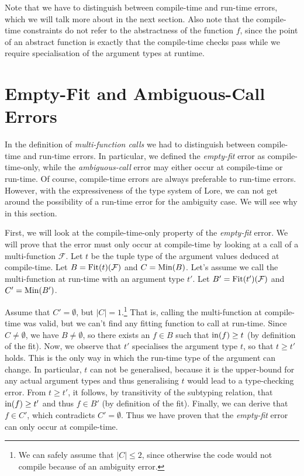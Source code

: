 \noindent Note that we have to distinguish between compile-time and run-time errors, which we will talk more about in the next section. Also note that the compile-time constraints do not refer to the abstractness of the function $f$, since the point of an abstract function is exactly that the compile-time checks pass while we require specialisation of the argument types at runtime.



\section{Empty-Fit and Ambiguous-Call Errors} \label{section:empty-fit-ambiguous-call}

In the definition of \textit{multi-function calls} we had to distinguish between compile-time and run-time errors. In particular, we defined the \textit{empty-fit} error as compile-time-only, while the \textit{ambiguous-call} error may either occur at compile-time or run-time. Of course, compile-time errors are always preferable to run-time errors. However, with the expressiveness of the type system of Lore, we can not get around the possibility of a run-time error for the ambiguity case. We will see why in this section.

\bigskip

\noindent First, we will look at the compile-time-only property of the \textit{empty-fit} error. We will prove that the error must only occur at compile-time by looking at a call of a multi-function $\mathcal{F}$. Let $t$ be the tuple type of the argument values deduced at compile-time. Let $B = \operatorname{Fit}(t)(\mathcal{F})$ and $C = \operatorname{Min}(B)$. Let's assume we call the multi-function at run-time with an argument type $t'$. Let $B' = \operatorname{Fit}(t')(\mathcal{F})$ and $C' = \operatorname{Min}(B')$. 

Assume that $C' = \emptyset$, but $|C| = 1$.\footnote{We can safely assume that $|C| \leq 2$, since otherwise the code would not compile because of an ambiguity error.} That is, calling the multi-function at compile-time was valid, but we can't find any fitting function to call at run-time. Since $C \neq \emptyset$, we have $B \neq \emptyset$, so there exists an $f \in B$ such that $\operatorname{in}(f) \geq t$ (by definition of the fit). Now, we observe that $t'$ specialises the argument type $t$, so that $t \geq t'$ holds. This is the only way in which the run-time type of the argument can change. In particular, $t$ can not be generalised, because it is the upper-bound for any actual argument types and thus generalising $t$ would lead to a type-checking error. From $t \geq t'$, it follows, by transitivity of the subtyping relation, that $\operatorname{in}(f) \geq t'$ and thus $f \in B'$ (by definition of the fit). Finally, we can derive that $f \in C'$, which contradicts $C' = \emptyset$. Thus we have proven that the \textit{empty-fit} error can only occur at compile-time.

